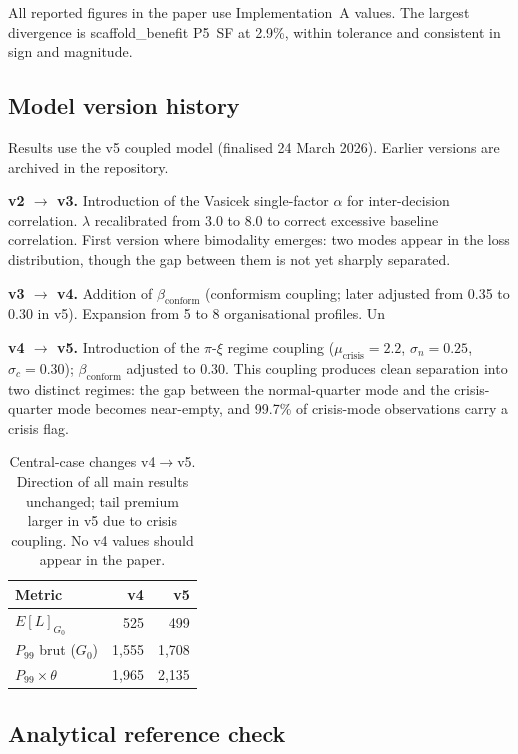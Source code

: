 \documentclass[11pt,a4paper]{article}
\begin{document}
\begin{appendices}
All reported figures in the paper use Implementation~A values. The largest
divergence is scaffold\_benefit P5~SF at 2.9\%, within tolerance and
consistent in sign and magnitude.

\subsection{Model version history}\label{app:repro:versions}

Results use the v5 coupled model (finalised 24 March 2026). Earlier versions
are archived in the repository.

\textbf{v2 $\to$ v3.}
Introduction of the Vasicek single-factor $\alpha$ for inter-decision
correlation. $\lambda$ recalibrated from 3.0 to 8.0 to correct excessive
baseline correlation. First version where bimodality emerges: two modes
appear in the loss distribution, though the gap between them is not yet
sharply separated.

\textbf{v3 $\to$ v4.}
Addition of $\beta_{\text{conform}}$ (conformism coupling; later adjusted
from 0.35 to 0.30 in v5). Expansion from 5 to 8 organisational profiles.
Un 

\textbf{v4 $\to$ v5.}
Introduction of the $\pi$-$\xi$ regime coupling
($\mu_{\text{crisis}} = 2.2$, $\sigma_n = 0.25$, $\sigma_c = 0.30$);
$\beta_{\text{conform}}$ adjusted to 0.30. This coupling produces clean
separation into two distinct regimes: the gap between the normal-quarter
mode and the crisis-quarter mode becomes near-empty, and 99.7\% of
crisis-mode observations carry a crisis flag.

\begin{table}[H]
\centering\small
\setlength{\tabcolsep}{8pt}
\renewcommand{\arraystretch}{1.20}
\begin{tabular}{@{}l r r@{}}
\toprule
\textbf{Metric} & \textbf{v4} & \textbf{v5} \\
\midrule
$E[L]_{G_0}$             & 525 & 499 \\
$P_{99}$ brut ($G_0$)    & 1,555 & 1,708 \\
$P_{99}\times\theta$     & 1,965 & 2,135 \\
\bottomrule
\end{tabular}
\caption{Central-case changes v4$\to$v5. Direction of all main results
unchanged; tail premium larger in v5 due to crisis coupling. No v4 values
should appear in the paper.}
\label{tab:version_changes}
\end{table}

\subsection{Analytical reference check}\label{app:repro:refcheck}


\end{appendices}
\end{document}
